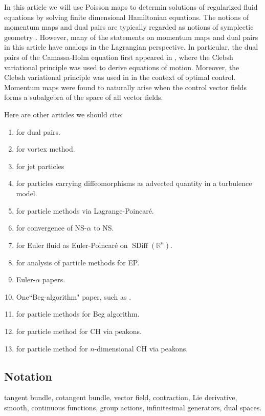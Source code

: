 \documentclass[12pt]{amsart}
\newcommand{\R}{\ensuremath{\mathbb{R}}}
\DeclareMathOperator{\SDiff}{SDiff}
\begin{document}
In this article we will use Poisson maps to determin solutions of regularized
fluid equations by solving finite dimensional Hamiltonian equations.
The notions of momentum maps and dual pairs are typically
regarded as notions of symplectic geometry \cite{FOM,Weinstein1983}.
However, many of the statements on momentum maps and
dual pairs in this article
have analogs in the Lagrangian perspective.
In particular, the dual pairs of the Camassa-Holm equation
first appeared in \cite{HolmMarsden2005}, where the Clebsh
variational principle was used to derive equations of motion.
Moreover, the Clebsh variational principle was used in
\cite{CotterHolm2009} in the context of optimal control.
Momentum maps were found to naturally arise when the
control vector fields forms a subalgebra of the space of all
 vector fields.
 
 Here are other articles we should cite:
 \begin{enumerate}
 	\item \cite{MarsdenWeinstein1983,Weinstein1983} for dual pairs.
 	\item \cite{Chorin1973} for vortex method.
	\item \cite{Sommer2013,CotterHolmJacobsMeier2014} for jet particles
	\item \cite{HolmTronci2012} for particles carrying diffeomorphisms as advected quantity in a turbulence model.
 	\item \cite{JacobsRatiuDesbrun2013} for particle methods via Lagrange-Poincar\'e.
	\item \cite{FoiasHolmTiti2001} for convergence of NS-$\alpha$ to NS.
	\item \cite{Arnold1966} for Euler fluid as Euler-Poincar\'e on $\SDiff(\R^n)$.
	\item \cite{TrouveYounes2005} for analysis of particle methods for EP.
	\item Euler-$\alpha$ papers.
	\item One``Beg-algorithm" paper, such as \cite{Beg2005}.
	\item \cite{JoshiMiller2000} for particle methods for Beg algorithm.
	\item \cite{HoldenRaynaud2006} for particle method for CH via peakons.
	\item \cite{ChertockDuToitMarsden2012} for particle method for $n$-dimensional CH via peakons.
 \end{enumerate}

\subsection{Notation}
tangent bundle, cotangent bundle, vector field, contraction, Lie derivative,
smooth, continuous functions, group actions, infinitesimal generators,
dual spaces.
\end{document}
